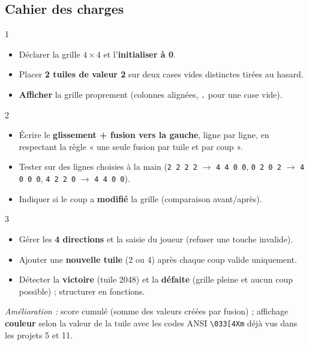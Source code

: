 \subsection*{Cahier des charges}
\begin{UPSTICahierDesCharges}{1}
\begin{itemize}
  \item Déclarer la grille $4\times4$ et l'\textbf{initialiser à 0}.
  \item Placer \textbf{2 tuiles de valeur 2} sur deux cases vides distinctes tirées au hasard.
  \item \textbf{Afficher} la grille proprement (colonnes alignées, \texttt{.} pour une case vide).
\end{itemize}
\end{UPSTICahierDesCharges}

\begin{UPSTICahierDesCharges}{2}
\begin{itemize}
  \item Écrire le \textbf{glissement + fusion vers la gauche}, ligne par ligne, en respectant la règle « une seule fusion par tuile et par coup ».
  \item Tester sur des lignes choisies à la main (\texttt{2 2 2 2} $\rightarrow$ \texttt{4 4 0 0}, \texttt{0 2 0 2} $\rightarrow$ \texttt{4 0 0 0}, \texttt{4 2 2 0} $\rightarrow$ \texttt{4 4 0 0}).
  \item Indiquer si le coup a \textbf{modifié} la grille (comparaison avant/après).
\end{itemize}
\end{UPSTICahierDesCharges}

\begin{UPSTICahierDesCharges}{3}
\begin{itemize}
  \item Gérer les \textbf{4 directions} et la saisie du joueur (refuser une touche invalide).
  \item Ajouter une \textbf{nouvelle tuile} (2 ou 4) après chaque coup valide uniquement.
  \item Détecter la \textbf{victoire} (tuile 2048) et la \textbf{défaite} (grille pleine et aucun coup possible) ; structurer en fonctions.
\end{itemize}
\end{UPSTICahierDesCharges}

\textit{Amélioration :} score cumulé (somme des valeurs créées par fusion) ; affichage \textbf{couleur} selon la valeur de la tuile avec les codes ANSI \texttt{\textbackslash033[4Xm} déjà vus dans les projets 5 et 11.

